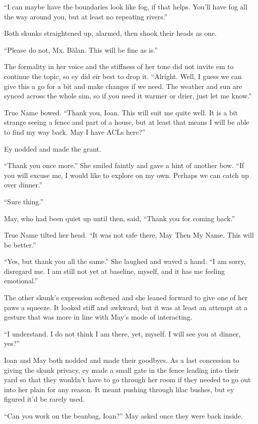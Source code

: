 ``I can maybe have the boundaries look like fog, if that helps. You'll have fog all the way around you, but at least no repeating rivers.''

Both skunks straightened up, alarmed, then shook their heads as one.

``Please do not, Mx. Bălan. This will be fine as is.''

The formality in her voice and the stiffness of her tone did not invite em to continue the topic, so ey did eir best to drop it. ``Alright. Well, I guess we can give this a go for a bit and make changes if we need. The weather and sun are synced across the whole sim, so if you need it warmer or drier, just let me know.''

True Name bowed. ``Thank you, Ioan. This will suit me quite well. It is a bit strange seeing a fence and part of a house, but at least that means I will be able to find my way back. May I have ACLs here?''

Ey nodded and made the grant.

``Thank you once more.'' She smiled faintly and gave a hint of another bow. ``If you will excuse me, I would like to explore on my own. Perhaps we can catch up over dinner.''

``Sure thing.''

May, who had been quiet up until then, said, ``Thank you for coming back.''

True Name tilted her head. ``It was not safe there, May Then My Name. This will be better.''

``Yes, but thank you all the same.'' She laughed and waved a hand. ``I am sorry, disregard me. I am still not yet at baseline, myself, and it has me feeling emotional.''

The other skunk's expression softened and she leaned forward to give one of her paws a squeeze. It looked stiff and awkward, but it was at least an attempt at a gesture that was more in line with May's mode of interacting.

``I understand. I do not think I am there, yet, myself. I will see you at dinner, yes?''

Ioan and May both nodded and made their goodbyes. As a last concession to giving the skunk privacy, ey made a small gate in the fence leading into their yard so that they wouldn't have to go through her room if they needed to go out into her plain for any reason. It meant pushing through lilac bushes, but ey figured it'd be rarely used.

``Can you work on the beanbag, Ioan?'' May asked once they were back inside.

